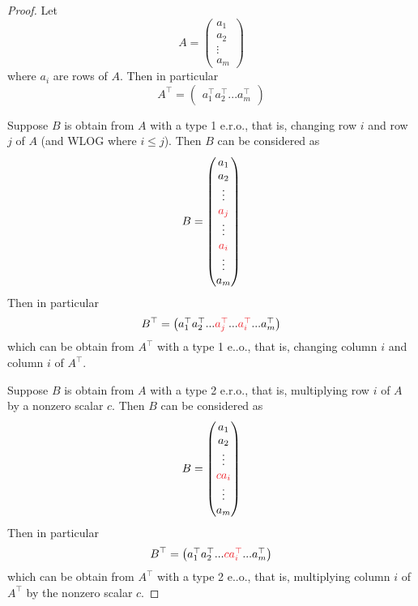 \begin{proof}
Let
\[
    A = \begin{pmatrix} a_1 \\ a_2 \\ \vdots \\ a_m \end{pmatrix}
\]
where \(a_i\) are rows of \(A\).
Then in particular
\[
    A^\top = \begin{pmatrix} a_1^\top a_2^\top ... a_m^\top \end{pmatrix}
\]

Suppose \(B\) is obtain from \(A\) with a type 1 e.r.o., that is, changing row \(i\) and row \(j\) of \(A\) (and WLOG where \(i \le j\)).
Then \(B\) can be considered as
\[
    B = \begin{pmatrix} a_1 \\ a_2 \\ \vdots \\ \RED{a_j} \\ \vdots \\ \RED{a_i} \\ \vdots \\ a_m \end{pmatrix}
\]
Then in particular
\[
    B^\top = \begin{pmatrix} a_1^\top a_2^\top ... \RED{a_j^\top} ... \RED{a_i^\top} ... a_m^\top \end{pmatrix}
\]
which can be obtain from \(A^\top\) with a type 1 e..o., that is, changing column \(i\) and column \(i\) of \(A^\top\).

Suppose \(B\) is obtain from \(A\) with a type 2 e.r.o., that is, multiplying row \(i\) of \(A\) by a nonzero scalar \(c\).
Then \(B\) can be considered as
\[
    B = \begin{pmatrix} a_1 \\ a_2 \\ \vdots \\ \RED{ca_i} \\ \vdots \\ a_m \end{pmatrix}
\]
Then in particular
\[
    B^\top = \begin{pmatrix} a_1^\top a_2^\top ... \RED{ca_i^\top} ... a_m^\top \end{pmatrix}
\]
which can be obtain from \(A^\top\) with a type 2 e..o., that is, multiplying column \(i\) of \(A^\top\) by the nonzero scalar \(c\).


\end{proof}
